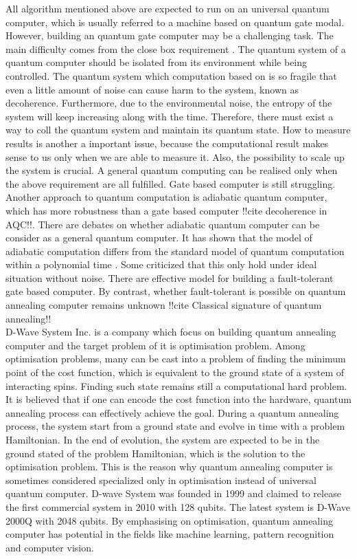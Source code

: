 \documentclass[twoside,a4paper,article]{combine}
\begin{document}
All algorithm mentioned above are expected to run on an universal quantum computer, which is usually referred to a machine based on quantum gate modal. However, building an quantum gate computer may be a challenging task. The main difficulty comes from the close box requirement \cite{Ladd2010}. The quantum system of a quantum computer should be isolated from its environment while being controlled. The quantum system which computation based on is so fragile that even a little amount of noise can cause harm to the system, known as decoherence. Furthermore, due to the environmental noise, the entropy of the system will keep increasing along with the time. Therefore, there must exist a way to coll the quantum system and maintain its quantum state. How to measure results is another a important issue, because the computational result makes sense to us only when we are able to measure it. Also, the possibility to scale up the system is crucial. A general quantum computing can be realised only when the above requirement are all fulfilled. Gate based computer is still struggling. Another approach to quantum computation is adiabatic quantum computer, which has more robustness than a gate based computer !!cite decoherence in AQC!!. There are debates on whether adiabatic quantum computer can be consider as a general quantum computer. It has shown that the model of adiabatic computation differs from the standard model of quantum computation within a polynomial time \cite{Aharonov2004}\cite{Farhi2000}. Some criticized that this only hold under ideal situation without noise. There are effective model for building a fault-tolerant gate based computer. By contrast, whether fault-tolerant is possible on quantum annealing computer remains unknown !!cite Classical signature of quantum annealing!!
\\

D-Wave System Inc. is a company which focus on building quantum annealing computer and the target problem of it is optimisation problem. Among optimisation problems, many can be cast into a problem of finding the minimum point of the cost function, which is equivalent to the ground state of a system of interacting spins. Finding such state remains still a computational hard problem. It is believed that if one can encode the cost function into the hardware, quantum annealing process can effectively achieve the goal\cite{Johnson2011}. During a quantum annealing process, the system start from a ground state and evolve in time with a problem Hamiltonian. In the end of evolution, the system are expected to be in the ground stated of the problem Hamiltonian, which is the solution to the optimisation problem. This is the reason why quantum annealing computer is sometimes considered specialized only in optimisation instead of universal quantum computer. D-wave System was founded  in 1999 and claimed to release the first commercial system in 2010 with 128 qubits. The latest system is D-Wave 2000Q with 2048 qubits. By emphasising on optimisation, quantum annealing computer has potential in the fields like machine learning, pattern recognition and computer vision. 
\\
\end{document}
